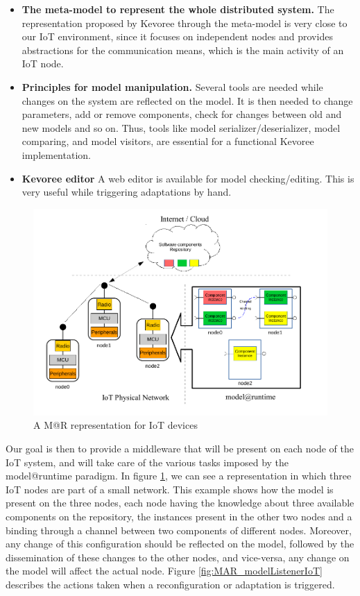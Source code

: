 \begin{itemize}
	\item \textbf{The meta-model to represent the whole distributed system.} The representation proposed by Kevoree through the meta-model is very close to our IoT environment, since it focuses on independent nodes and provides abstractions for the communication means, which is the main activity of an IoT node.
	\item \textbf{Principles for model manipulation.} Several tools are needed while changes on the system are reflected on the model. It is then needed to change parameters, add or remove components, check for changes between old and new models and so on. Thus, tools like model serializer/deserializer, model comparing, and model visitors, are essential for a functional Kevoree implementation.
	\item \textbf{Kevoree editor} A web editor is available for model checking/editing. This is very useful while triggering adaptations by hand.
\end{itemize}
\begin{figure}[]
	\centering
	\includegraphics[width=1\columnwidth]{chapters/modelsAtRuntimeContiki.images/MAR_IOT.pdf}
	\caption{A M@R representation for IoT devices}
	\label{fig:MAR_IOT}
\end{figure}
Our goal is then to provide a middleware that will be present on each node of the IoT system, and will take care of the various tasks imposed by the model@runtime paradigm.
In figure \ref{fig:MAR_IOT}, we can see a representation in which three IoT nodes are part of a small network.
This example shows how the model is present on the three nodes, each node having the knowledge about three available components on the repository, the instances present in the other two nodes and a binding through a channel between two components of different nodes.
Moreover, any change of this configuration should be reflected on the model, followed by the dissemination of these changes to the other nodes, and vice-versa, any change on the model will affect the actual node.
Figure \ref{fig:MAR_modelListenerIoT} describes the actions taken when a reconfiguration or adaptation is triggered.

